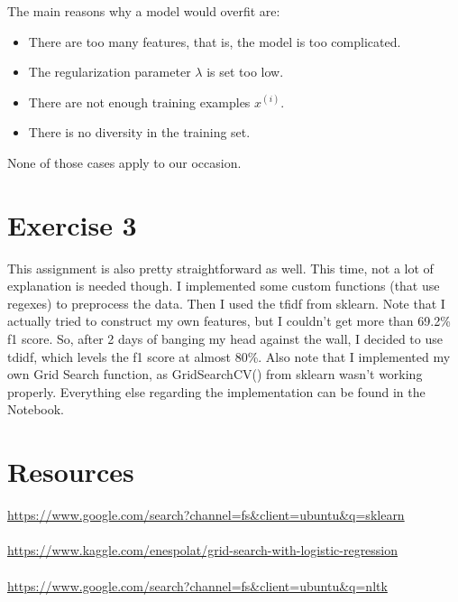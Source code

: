 \documentclass[12pt]{report}
\begin{document}
\begin{itemize}
        The main reasons why a model would overfit are:
        \begin{itemize}
            \item There are too many features, that is, the model is too complicated.
            \item The regularization parameter $\lambda$ is set too low.
            \item There are not enough training examples $x^{(i)}$.
            \item There is no diversity in the training set.
        \end{itemize}
        None of those cases apply to our occasion.
\end{itemize}


\section*{Exercise 3}
This assignment is also pretty straightforward as well. This time, not a lot of
explanation is needed though. I implemented some custom functions (that use regexes)
to preprocess the data. Then I used the tfidf from sklearn. Note that I actually tried to
construct my own features, but I couldn't get more than 69.2\% f1 score. So, after 2 days of
banging my head against the wall, I decided to use tdidf, which levels the f1 score at almost 80\%.
Also note that I implemented my own Grid Search function, as GridSearchCV() from sklearn wasn't
working properly. Everything else regarding the implementation can be found in the Notebook.



\section*{Resources}

\url{https://www.google.com/search?channel=fs&client=ubuntu&q=sklearn} \\ \\
\url{https://www.kaggle.com/enespolat/grid-search-with-logistic-regression} \\ \\
\url{https://www.google.com/search?channel=fs&client=ubuntu&q=nltk}
\end{document}
